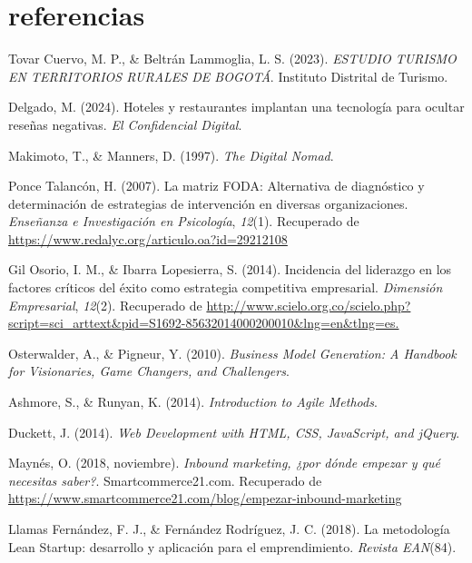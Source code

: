 
\section{referencias}
\begin{thebibliography}{99}

    Tovar Cuervo, M. P., \& Beltrán Lammoglia, L. S. (2023).
    \textit{ESTUDIO TURISMO EN TERRITORIOS RURALES DE BOGOTÁ}.
    Instituto Distrital de Turismo.

    Delgado, M. (2024).
    Hoteles y restaurantes implantan una tecnología para ocultar reseñas negativas.
    \textit{El Confidencial Digital}.

    Makimoto, T., \& Manners, D. (1997).
    \textit{The Digital Nomad}.

    Ponce Talancón, H. (2007).
    La matriz FODA: Alternativa de diagnóstico y determinación de estrategias de intervención en diversas organizaciones.
    \textit{Enseñanza e Investigación en Psicología}, \textit{12}(1).
    Recuperado de \url{https://www.redalyc.org/articulo.oa?id=29212108}

    Gil Osorio, I. M., \& Ibarra Lopesierra, S. (2014).
    Incidencia del liderazgo en los factores críticos del éxito como estrategia competitiva empresarial.
    \textit{Dimensión Empresarial}, \textit{12}(2).
    Recuperado de \url{http://www.scielo.org.co/scielo.php?script=sci_arttext&pid=S1692-85632014000200010&lng=en&tlng=es.}

    Osterwalder, A., \& Pigneur, Y. (2010).
    \textit{Business Model Generation: A Handbook for Visionaries, Game Changers, and Challengers}.

    Ashmore, S., \& Runyan, K. (2014).
    \textit{Introduction to Agile Methods}.

    Duckett, J. (2014).
    \textit{Web Development with HTML, CSS, JavaScript, and jQuery}.

    Maynés, O. (2018, noviembre).
    \textit{Inbound marketing, ¿por dónde empezar y qué necesitas saber?}.
    Smartcommerce21.com.
    Recuperado de \url{https://www.smartcommerce21.com/blog/empezar-inbound-marketing}

    Llamas Fernández, F. J., \& Fernández Rodríguez, J. C. (2018).
    La metodología Lean Startup: desarrollo y aplicación para el emprendimiento.
    \textit{Revista EAN}(84).

\end{thebibliography}
